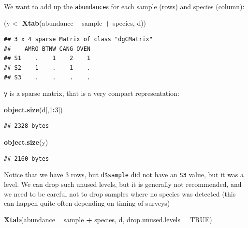 \documentclass[12pt,]{scrbook}
\newenvironment{Shaded}{\begin{snugshade}}{\end{snugshade}}
\newcommand{\DataTypeTok}[1]{\textcolor[rgb]{0.13,0.29,0.53}{#1}}
\newcommand{\DecValTok}[1]{\textcolor[rgb]{0.00,0.00,0.81}{#1}}
\newcommand{\KeywordTok}[1]{\textcolor[rgb]{0.13,0.29,0.53}{\textbf{#1}}}
\newcommand{\NormalTok}[1]{#1}
\newcommand{\OperatorTok}[1]{\textcolor[rgb]{0.81,0.36,0.00}{\textbf{#1}}}
\newcommand{\OtherTok}[1]{\textcolor[rgb]{0.56,0.35,0.01}{#1}}
\newcommand{\StringTok}[1]{\textcolor[rgb]{0.31,0.60,0.02}{#1}}
\begin{document}
We want to add up the \texttt{abundance}s for each sample (rows) and species (column):

\begin{Shaded}
\begin{Highlighting}[]
\NormalTok{(y <-}\StringTok{ }\KeywordTok{Xtab}\NormalTok{(abundance }\OperatorTok{~}\StringTok{ }\NormalTok{sample }\OperatorTok{+}\StringTok{ }\NormalTok{species, d))}
\end{Highlighting}
\end{Shaded}

\begin{verbatim}
## 3 x 4 sparse Matrix of class "dgCMatrix"
##    AMRO BTNW CANG OVEN
## S1    .    1    2    1
## S2    1    .    1    .
## S3    .    .    .    .
\end{verbatim}

\texttt{y} is a sparse matrix, that is a very compact representation:

\begin{Shaded}
\begin{Highlighting}[]
\KeywordTok{object.size}\NormalTok{(d[,}\DecValTok{1}\OperatorTok{:}\DecValTok{3}\NormalTok{])}
\end{Highlighting}
\end{Shaded}

\begin{verbatim}
## 2328 bytes
\end{verbatim}

\begin{Shaded}
\begin{Highlighting}[]
\KeywordTok{object.size}\NormalTok{(y)}
\end{Highlighting}
\end{Shaded}

\begin{verbatim}
## 2160 bytes
\end{verbatim}

Notice that we have 3 rows, but \texttt{d\$sample} did not have an \texttt{S3} value, but it was a level.
We can drop such unused levels, but it is generally not recommended, and we need to be careful
not to drop samples where no species was detected (this can happen quite often depending on timing of
surveys)

\begin{Shaded}
\begin{Highlighting}[]
\KeywordTok{Xtab}\NormalTok{(abundance }\OperatorTok{~}\StringTok{ }\NormalTok{sample }\OperatorTok{+}\StringTok{ }\NormalTok{species, d, }\DataTypeTok{drop.unused.levels =} \OtherTok{TRUE}\NormalTok{)}
\end{Highlighting}
\end{Shaded}
\end{document}
